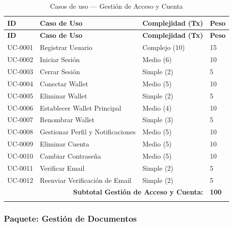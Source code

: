 \documentclass[11pt, a4paper]{article}
\begin{document}
\begin{longtable}{|p{1.8cm}|p{6.5cm}|p{3cm}|p{1.5cm}|}
\hline
\textbf{ID} & \textbf{Caso de Uso} & \textbf{Complejidad (Tx)} & \textbf{Peso} \\
\hline
\endfirsthead
\hline
\textbf{ID} & \textbf{Caso de Uso} & \textbf{Complejidad (Tx)} & \textbf{Peso} \\
\hline
\endhead
UC-0001 & Registrar Usuario & Complejo (10) & 15 \\
\hline
UC-0002 & Iniciar Sesión & Medio (6) & 10 \\
\hline
UC-0003 & Cerrar Sesión & Simple (2) & 5 \\
\hline
UC-0004 & Conectar Wallet & Medio (5) & 10 \\
\hline
UC-0005 & Eliminar Wallet & Simple (2) & 5 \\
\hline
UC-0006 & Establecer Wallet Principal & Medio (4) & 10 \\
\hline
UC-0007 & Renombrar Wallet & Simple (3) & 5 \\
\hline
UC-0008 & Gestionar Perfil y Notificaciones & Medio (5) & 10 \\
\hline
UC-0009 & Eliminar Cuenta & Medio (5) & 10 \\
\hline
UC-0010 & Cambiar Contraseña & Medio (5) & 10 \\
\hline
UC-0011 & Verificar Email & Simple (2) & 5 \\
\hline
UC-0012 & Reenviar Verificación de Email & Simple (2) & 5 \\
\hline
\multicolumn{3}{|r|}{\textbf{Subtotal Gestión de Acceso y Cuenta:}} & \textbf{100} \\
\hline
\caption{Casos de uso --- Gestión de Acceso y Cuenta}\label{tab:uc-acceso}
\end{longtable}

\subsubsection*{Paquete: Gestión de Documentos}
\end{document}

